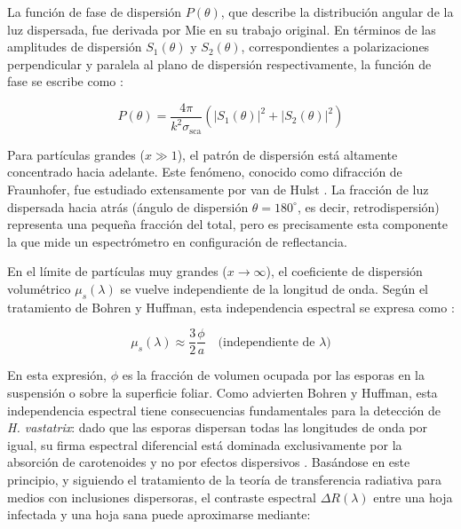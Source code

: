 \documentclass[12pt, a4paper]{article}
\begin{document}
	La función de fase de dispersión $P(\theta)$, que describe la distribución angular de la luz dispersada, fue derivada por Mie en su trabajo original. En términos de las amplitudes de dispersión $S_1(\theta)$ y $S_2(\theta)$, correspondientes a polarizaciones perpendicular y paralela al plano de dispersión respectivamente, la función de fase se escribe como \parencite{bohren1983}:
	
	\begin{equation}
		P(\theta) = \frac{4\pi}{k^2 \sigma_{\text{sca}}} \left( |S_1(\theta)|^2 + |S_2(\theta)|^2 \right)
		\label{eq:funcion_fase_mie}
	\end{equation}
	
	Para partículas grandes ($x \gg 1$), el patrón de dispersión está altamente concentrado hacia adelante. Este fenómeno, conocido como difracción de Fraunhofer, fue estudiado extensamente por van de Hulst \parencite{vandeHulst1981}. La fracción de luz dispersada hacia atrás (ángulo de dispersión $\theta = 180^\circ$, es decir, retrodispersión) representa una pequeña fracción del total, pero es precisamente esta componente la que mide un espectrómetro en configuración de reflectancia.
	
	En el límite de partículas muy grandes ($x \rightarrow \infty$), el coeficiente de dispersión volumétrico $\mu_s(\lambda)$ se vuelve independiente de la longitud de onda. Según el tratamiento de Bohren y Huffman, esta independencia espectral se expresa como \parencite{bohren1983}:
	
	\begin{equation}
		\mu_s(\lambda) \approx \frac{3}{2} \frac{\phi}{a} \quad \text{(independiente de } \lambda\text{)}
		\label{eq:mu_s_geometrico}
	\end{equation}
	
	En esta expresión, $\phi$ es la fracción de volumen ocupada por las esporas en la suspensión o sobre la superficie foliar. Como advierten Bohren y Huffman, esta independencia espectral tiene consecuencias fundamentales para la detección de \textit{H. vastatrix}: dado que las esporas dispersan todas las longitudes de onda por igual, su firma espectral diferencial está dominada exclusivamente por la absorción de carotenoides y no por efectos dispersivos \parencite{bohren1983}. Basándose en este principio, y siguiendo el tratamiento de la teoría de transferencia radiativa para medios con inclusiones dispersoras, el contraste espectral $\Delta R(\lambda)$ entre una hoja infectada y una hoja sana puede aproximarse mediante:
	
\end{document}
